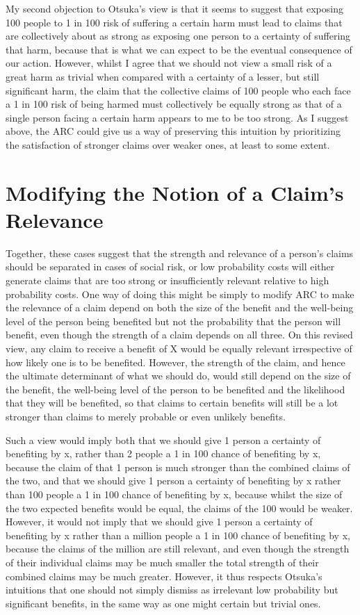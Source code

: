 \documentclass[man,11pt,a4paper]{apa7}
\begin{document}
My second objection to Otsuka's view is that it seems to suggest that exposing 100 people to 1 in 100 risk of suffering a certain harm must lead to claims that are collectively about as strong as exposing one person to a certainty of suffering that harm, because that is what we can expect to be the eventual consequence of our action. However, whilst I agree that we should not view a small risk of a great harm as trivial when compared with a certainty of a lesser, but still significant harm, the claim that the collective claims of 100 people who each face a 1 in 100 risk of being harmed must collectively be equally strong as that of a single person facing a certain harm appears to me to be too strong. As I suggest above, the ARC could give us a way of preserving this intuition by prioritizing the satisfaction of stronger claims over weaker ones, at least to some extent.

\section{Modifying the Notion of a Claim's Relevance}

Together, these cases suggest that the strength and relevance of a person's claims should be separated in cases of social risk, or low probability costs will either generate claims that are too strong or insufficiently relevant relative to high probability costs. One way of doing this might be simply to modify ARC to make the relevance of a claim depend on both the size of the benefit and the well-being level of the person being benefited but not the probability that the person will benefit, even though the strength of a claim depends on all three. On this revised view, any claim to receive a benefit of X would be equally relevant irrespective of how likely one is to be benefited. However, the strength of the claim, and hence the ultimate determinant of what we should do, would still depend on the size of the benefit, the well-being level of the person to be benefited and the likelihood that they will be benefited, so that claims to certain benefits will still be a lot stronger than claims to merely probable or even unlikely benefits.

Such a view would imply both that we should give 1 person a certainty of benefiting by x, rather than 2 people a 1 in 100 chance of benefiting by x, because the claim of that 1 person is much stronger than the combined claims of the two, and that we should give 1 person a certainty of benefiting by x rather than 100 people a 1 in 100 chance of benefiting by x, because whilst the size of the two expected benefits would be equal, the claims of the 100 would be weaker. However, it would not imply that we should give 1 person a certainty of benefiting by x rather than a million people a 1 in 100 chance of benefiting by x, because the claims of the million are still relevant, and even though the strength of their individual claims may be much smaller the total strength of their combined claims may be much greater. However, it thus respects Otsuka's intuitions that one should not simply dismiss as irrelevant low probability but significant benefits, in the same way as one might certain but trivial ones.
\end{document}
